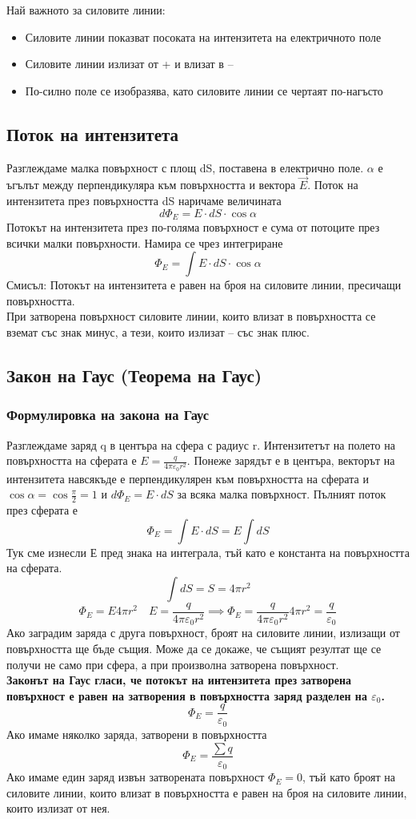 \documentclass[fleqn, 12pt]{article}
\theoremstyle{definition}
\begin{document}
Най важното за силовите линии:
\begin{itemize}
\item Силовите линии показват посоката на интензитета на електричното поле
\item Силовите линии излизат от + и влизат в –
\item По-силно поле се изобразява, като силовите линии се чертаят по-нагъсто 
\end{itemize}

\subsection{Поток на интензитета}
Разглеждаме малка повърхност с площ dS, поставена в електрично поле. $\alpha$ е ъгълът между перпендикуляра към повърхността и вектора $\vec{E}$.
Поток на интензитета през повърхността dS наричаме величината
$$d \Phi_E = E \cdot dS \cdot \cos \alpha $$ 
Потокът на интензитета през по-голяма повърхност е
сума от потоците през всички малки повърхности. Намира се чрез
интегриране 
$$\Phi_E = \int E \cdot dS \cdot \cos \alpha $$ 
Смисъл: Потокът на интензитета е
равен на броя на силовите линии, пресичащи повърхността. \\
При затворена повърхност силовите линии, които влизат в повърхността се вземат със знак
минус, а тези, които излизат – със знак плюс.

\subsection{Закон на Гаус (Теорема на Гаус)}

\subsubsection{Формулировка на закона на Гаус}
Разглеждаме заряд q в центъра на сфера с радиус r. 
Интензитетът на полето на повърхността на сферата е $E = \frac{q}{4 \pi \varepsilon_0 r^2}$. 
Понеже зарядът е в центъра, векторът на интензитета навсякъде е перпендикулярен към
повърхността на сферата и $\cos \alpha = \cos \frac{\pi}{2} = 1$ и $d \Phi_E = E \cdot dS$ 
за всяка малка повърхност. 
Пълният поток през сферата е
$$\Phi_E = \int E \cdot dS = E \int dS$$
Тук сме изнесли Е пред знака на
интеграла, тъй като е константа на повърхността на
сферата. 
$$\int dS = S = 4 \pi r^2$$
$$\Phi_E = E 4 \pi r^2 \quad E = \frac{q}{4 \pi \varepsilon_0 r^2} \implies \Phi_E = \frac{q}{4 \pi \varepsilon_0 r^2} 4 \pi r ^2 = \frac{q}{\varepsilon_0}$$
Ако заградим заряда с друга повърхност, броят на силовите линии, излизащи от
повърхността ще бъде същия. Може да се докаже, че същият резултат ще се получи не
само при сфера, а при произволна затворена повърхност.\\
\textbf{Законът на Гаус гласи, че потокът на интензитета през затворена повърхност е
равен на затворения в повърхността заряд разделен на $\varepsilon_0$.}
$$\Phi_E = \frac{q}{\varepsilon_0}$$
Ако имаме няколко заряда, затворени в повърхността
$$\Phi_E = \frac{\sum q}{\varepsilon_0}$$
Ако имаме един заряд извън затворената повърхност $\Phi_E = 0$, тъй като броят на
силовите линии, които влизат в повърхността е равен на броя на силовите линии, които
излизат от нея.
\end{document}
